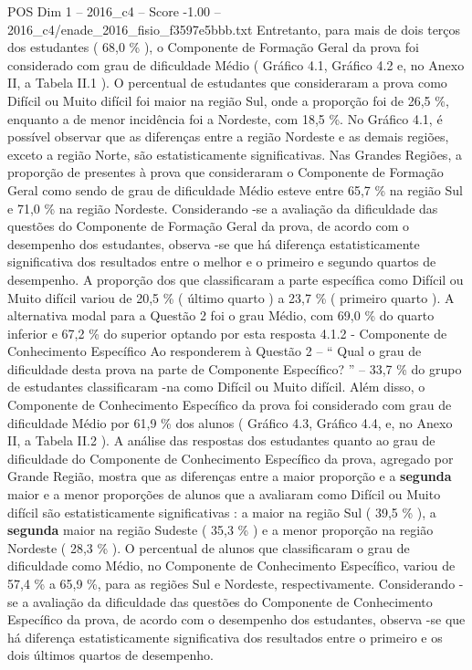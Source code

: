 \begin{textsample}{POS Dim 1 – 2016\_c4 – Score -1.00 – 2016\_c4/enade\_2016\_fisio\_f3597e5bbb.txt}
Entretanto, para mais de dois terços dos estudantes ( 68,0 \% ), o Componente de Formação Geral da prova foi considerado com grau de dificuldade Médio ( Gráfico 4.1, Gráfico 4.2 e, no Anexo II, a Tabela II.1 ).
O percentual de estudantes que consideraram a prova como Difícil ou Muito difícil foi maior na região Sul, onde a proporção foi de 26,5 \%, enquanto a de menor incidência foi a Nordeste, com 18,5 \%.
No Gráfico 4.1, é possível observar que as diferenças entre a região Nordeste e as demais regiões, exceto a região Norte, são estatisticamente significativas.
Nas Grandes Regiões, a proporção de presentes à prova que consideraram o Componente de Formação Geral como sendo de grau de dificuldade Médio esteve entre 65,7 \% na região Sul e 71,0 \% na região Nordeste.
Considerando -se a avaliação da dificuldade das questões do Componente de Formação Geral da prova, de acordo com o desempenho dos estudantes, observa -se que há diferença estatisticamente significativa dos resultados entre o melhor e o primeiro e segundo quartos de desempenho.
A proporção dos que classificaram a parte específica como Difícil ou Muito difícil variou de 20,5 \% ( último quarto ) a 23,7 \% ( primeiro quarto ).
A alternativa modal para a Questão 2 foi o grau Médio, com 69,0 \% do quarto inferior e 67,2 \% do superior optando por esta resposta 4.1.2 - Componente de Conhecimento Específico Ao responderem à Questão 2 – “ Qual o grau de dificuldade desta prova na parte de Componente Específico? ” – 33,7 \% do grupo de estudantes classificaram -na como Difícil ou Muito difícil.
Além disso, o Componente de Conhecimento Específico da prova foi considerado com grau de dificuldade Médio por 61,9 \% dos alunos ( Gráfico 4.3, Gráfico 4.4, e, no Anexo II, a Tabela II.2 ).
A análise das respostas dos estudantes quanto ao grau de dificuldade do Componente de Conhecimento Específico da prova, agregado por Grande Região, mostra que as diferenças entre a maior proporção e a \textbf{segunda} maior e a menor proporções de alunos que a avaliaram como Difícil ou Muito difícil são estatisticamente significativas : a maior na região Sul ( 39,5 \% ), a \textbf{segunda} maior na região Sudeste ( 35,3 \% ) e a menor proporção na região Nordeste ( 28,3 \% ).
O percentual de alunos que classificaram o grau de dificuldade como Médio, no Componente de Conhecimento Específico, variou de 57,4 \% a 65,9 \%, para as regiões Sul e Nordeste, respectivamente.
Considerando -se a avaliação da dificuldade das questões do Componente de Conhecimento Específico da prova, de acordo com o desempenho dos estudantes, observa -se que há diferença estatisticamente significativa dos resultados entre o primeiro e os dois últimos quartos de desempenho.

\end{textsample}
